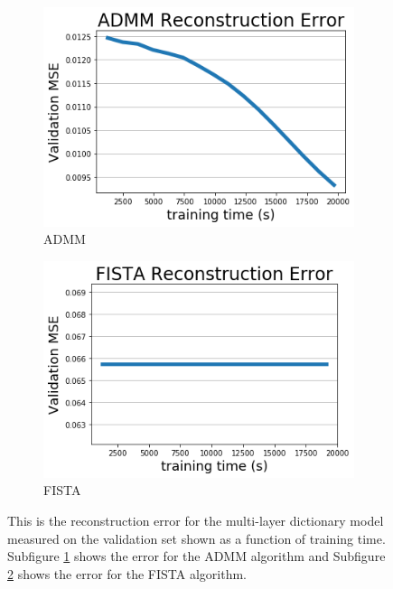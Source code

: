 \begin{figure}
\begin{subfigure}{.5\textwidth}
        \centering
	\includegraphics[width=.8\textwidth]{figures/ADMM_Recon_Err.png}
	\caption{ADMM}
	\label{figure:Train Error Curve ADMM}
\end{subfigure}
\begin{subfigure}{.5\textwidth}
        \centering
	\includegraphics[width=.8\textwidth]{figures/FISTA_Recon_Err.png}
	\caption{FISTA}
	\label{figure:Train Error Curve FISTA}
\end{subfigure}
     \caption{This is the reconstruction error for the multi-layer dictionary model measured on the validation set shown as a function of training time. Subfigure \ref{figure:Train Error Curve ADMM} shows the error for the ADMM algorithm and Subfigure \ref{figure:Train Error Curve FISTA} shows the error for the FISTA algorithm.}
     \label{figure:Train Error Curve}
\end{figure}

